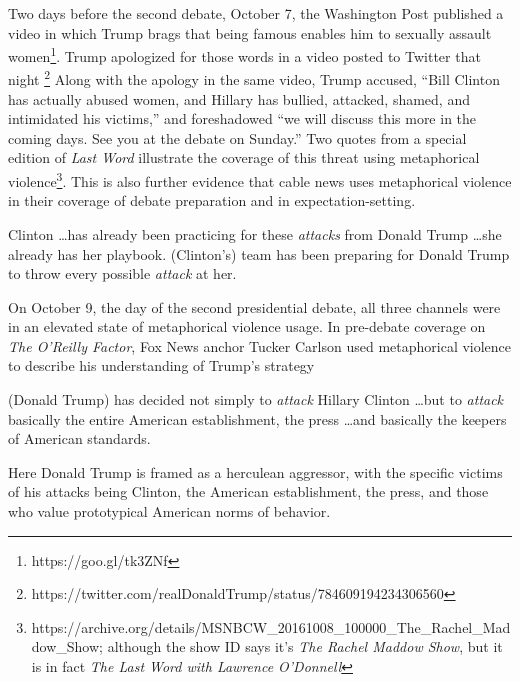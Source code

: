 Two days before the second debate, October 7, the Washington Post published a video
in which Trump brags that being famous enables him to 
sexually assault women\footnote{\tiny https://goo.gl/tk3ZNf}. 
Trump apologized for those words in a video posted to Twitter that night
\footnote{\tiny https://twitter.com/realDonaldTrump/status/784609194234306560} 
Along with the apology in the same video, Trump accused, ``Bill Clinton has actually
abused women, and Hillary has bullied, attacked, shamed, and 
intimidated his victims,'' and
foreshadowed ``we will discuss this more in the coming days. See you at the
debate on Sunday.'' 
Two quotes from a special edition of \emph{Last Word} illustrate the coverage
of this threat using metaphorical violence\footnote{\tiny https://archive.org/details/MSNBCW\_20161008\_100000\_The\_Rachel\_Maddow\_Show; although the show
ID says it's \emph{The Rachel Maddow Show}, but it is in fact 
\emph{The Last Word with Lawrence O'Donnell}}. This is also further evidence that
cable news uses metaphorical violence in their coverage of debate preparation
and in expectation-setting.  

\begin{exe}
  \ex Clinton \ldots has already been practicing for these \emph{attacks} from 
    Donald Trump \ldots she already has her playbook.
  \ex (Clinton's) team has been preparing for Donald Trump to throw every 
    possible \emph{attack} at her.
\end{exe}



On October 9, the day of the second presidential debate, 
all three channels were in an elevated state of 
metaphorical violence usage. In pre-debate coverage on \emph{The O'Reilly Factor},
Fox News anchor Tucker Carlson used metaphorical violence to 
describe his understanding of Trump's strategy
\begin{exe}
  \ex (Donald Trump) has decided not simply to \emph{attack} Hillary Clinton \ldots but to 
  \emph{attack} basically the entire American establishment, the press \ldots and
  basically the keepers of American standards.
\end{exe}
Here Donald Trump is framed as a herculean aggressor,
with the specific victims of his attacks being Clinton, the American establishment,
the press, and those who value prototypical American norms of behavior. 

